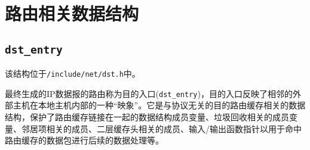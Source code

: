     \section{路由相关数据结构}
                
        \subsection{\texttt{dst_entry}}

            该结构位于\texttt{/include/net/dst.h}中。
            
            最终生成的IP数据报的路由称为目的入口(\texttt{dst_entry})，目的入口反映了相邻的外部主机在本地主机内部的一种“映象”。它是与协议无关的目的路由缓存相关的数据结构，保护了路由缓存链接在一起的数据结构成员变量、垃圾回收相关的成员变量、邻居项相关的成员、二层缓存头相关的成员、输入/输出函数指针以用于命中路由缓存的数据包进行后续的数据处理等。

